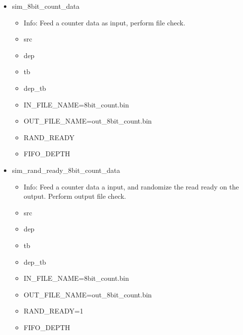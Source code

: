 \begin{itemize}
\begin{itemize}
	\item OUT\_FILE\_NAME=out\_random.bin
	\item RAND\_READY=1
	\item FIFO\_DEPTH
	\end{itemize}
\item sim\_8bit\_count\_data
	\begin{itemize}
	\item[$\space$] Info: Feed a counter data as input, perform file check.
	\item src
	\item dep
	\item tb
	\item dep\_tb
	\item IN\_FILE\_NAME=8bit\_count.bin
	\item OUT\_FILE\_NAME=out\_8bit\_count.bin
	\item RAND\_READY
	\item FIFO\_DEPTH
	\end{itemize}
\item sim\_rand\_ready\_8bit\_count\_data
	\begin{itemize}
	\item[$\space$] Info: Feed a counter data a input, and randomize the read ready on the output. Perform output file check.
	\item src
	\item dep
	\item tb
	\item dep\_tb
	\item IN\_FILE\_NAME=8bit\_count.bin
	\item OUT\_FILE\_NAME=out\_8bit\_count.bin
	\item RAND\_READY=1
	\item FIFO\_DEPTH
	\end{itemize}
\end{itemize}
